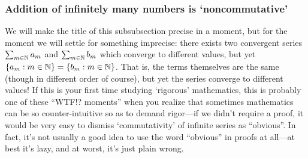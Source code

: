 \subsubsection{Addition of infinitely many numbers is `noncommutative'}

We will make the title of this subsubsection precise in a moment, but for the moment we will settle for something imprecise:  there exists two convergent series $\sum _{m\in \mathbb{N}}a_m$ and $\sum _{m\in \mathbb{N}}b_m$ which converge to different values, but yet $\{ a_m:m\in \mathbb{N} \} =\{ b_m:m\in \mathbb{N} \}$.  That is, the terms themselves are the same (though in different order of course), but yet the series converge to different values!  If this is your first time studying `rigorous' mathematics, this is probably one of these ``WTF!? moments'' when you realize that sometimes mathematics can be so counter-intuitive so as to demand rigor---if we didn't require a proof, it would be very easy to dismiss `commutativity' of infinite series as ``obvious''.  In fact, it's not usually a good idea to use the word ``obvious'' in proofs at all---at best it's lazy, and at worst, it's just plain wrong.
